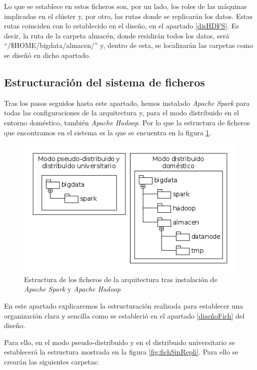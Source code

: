 Lo que se establece en estos ficheros son, por un lado, los roles de las máquinas implicadas en el clúster y, por otro, las rutas donde se replicarán los datos. Estas rutas coinciden con lo establecido en el diseño, en el apartado \ref{disHDFS}. Es decir, la ruta de la carpeta almacén, donde residirán todos los datos, será ``/\$HOME/bigdata/almacen/'' y, dentro de esta, se localizarán las carpetas como se diseñó en dicho apartado.

\subsection{Estructuración del sistema de ficheros}
Tras los pasos seguidos hasta este apartado, hemos instalado \textit{Apache Spark} para todas las configuraciones de la arquitectura y, para el modo distribuido en el entorno doméstico, también \textit{Apache Hadoop}. Por lo que la estructura de ficheros que encontramos en el sistema es la que se encuentra en la figura \ref{fig:fichAntes}.

\begin{figure}[htp!]
\centering
\caption{Estructura de los ficheros de la arquitectura tras instalación de \textit{Apache Spark} y \textit{Apache Hadoop}}
\label{fig:fichAntes}
\includegraphics[scale=0.7]{diagramas/fichAntes}
\end{figure}

En este apartado explicaremos la estructuración realizada para establecer una organización clara y sencilla como se estableció en el apartado \ref{diseñoFich} del diseño.

Para ello, en el modo pseudo-distribuido y en el distribuido universitario se establecerá la estructura mostrada en la figura \ref{fig:fichSinRepli}. Para ello se crearán las siguientes carpetas:

